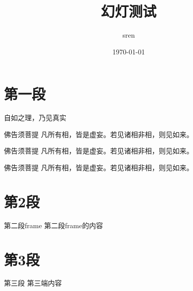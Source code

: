 \documentclass{beamer}
\begin{document}
\begin{frame}
  \title{幻灯测试}
  \author{sren}
  \date{\today}
  \maketitle
\end{frame}




\section{第一段}
\frame{\tableofcontents[currentsection]}
\begin{frame}{自如之理，乃见真实}
  \begin{block}{佛告须菩提} 
    凡所有相，皆是虚妄。若见诸相非相，则见如来。 
  \end{block} 
  \begin{alertblock}{佛告须菩提} 凡所有相，皆是虚妄。若见诸相非相，则见如来。 
  \end{alertblock} 
  \begin {exampleblock}{佛告须菩提} 凡所有相，皆是虚妄。若见诸相非相，则见如来。 
  \end{exampleblock}
\end{frame}


\section{第2段}
\frame{\tableofcontents[currentsection]}
\begin{frame}{第二段frame}
  第二段frame的内容
\end{frame}

\section{第3段}
\frame{\tableofcontents[currentsection]}
\begin{frame}{第三段}
  第三端内容
\end{frame}
\end{document}
